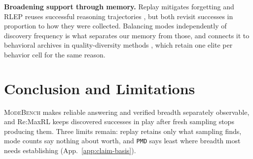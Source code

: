\documentclass{article}
\newcommand{\1}{\mathbf 1}
\newcommand{\mb}{\textsc{ModeBench}}
\newcommand{\pmd}{\texttt{PMD}}
\theoremstyle{remark}
\theoremstyle{definition}
\theoremstyle{plain}
\begin{document}
\textbf{Broadening support through memory.} Replay mitigates forgetting
\citep{lin1992selfimproving,rolnick2019replay} and RLEP reuses successful
reasoning trajectories \citep{zhang2025rlep}, but both revisit successes in
proportion to how they were collected. Balancing modes independently
of discovery frequency is what separates our memory from those, and connects it
to behavioral archives in quality-diversity methods
\citep{mouret2015illuminating,ecoffet2021return}, which retain one elite per
behavior cell for the same reason.

\section{Conclusion and Limitations}
\label{sec:conclusion}
\label{sec:discussion}
\label{sec:limitations}

\mb{} makes reliable answering and verified breadth separately observable, and
Re:MaxRL keeps discovered successes in play after fresh sampling stops
producing them. Three limits remain: replay retains only what sampling
finds, mode counts say nothing about worth, and \pmd{} says least where breadth
most needs establishing (App.~\ref{app:claim-basis}).

\label{sec:main-end}

\clearpage
{}\label{sec:references}



\long{}
\end{document}
